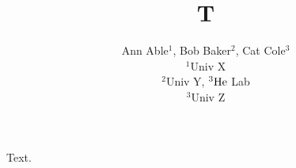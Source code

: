 \documentclass{article}
\begin{document}
\title{T}
\author{Ann Able$^{1}$, Bob Baker$^{2}$, Cat Cole$^{3}$\\ $^{1}$Univ X\\ $^{2}$Univ Y, ${\rm ^{3}He}$ Lab\\ $^{3}$Univ Z}
\maketitle
Text.
\end{document}
